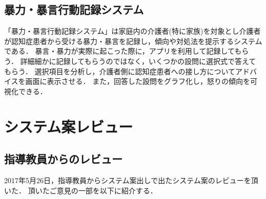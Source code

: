 \documentclass[../report]{subfiles}
\begin{document}
\subsection{暴力・暴言行動記録システム}
「暴力・暴言行動記録システム」は家庭内の介護者(特に家族)を対象とし介護者が認知症患者から受ける暴力・暴言を記録し，傾向や対処法を提示するシステムである．
暴言・暴力が実際に起こった際に，アプリを利用して記録してもらう．
詳細細かに記録してもらうのではなく，いくつかの設問に選択式で答えてもらう．
選択項目を分析し，介護者側に認知症患者への接し方についてアドバイスを画面に表示させる．
また，回答した設問をグラフ化し，怒りの傾向を可視化できる．


\section{システム案レビュー} \label{sec:4_hyouka_before}
\subsection{指導教員からのレビュー}
2017年5月26日，指導教員からシステム案出しで出たシステム案のレビューを頂いた．
頂いたご意見の一部を以下に紹介する．
\end{document}
